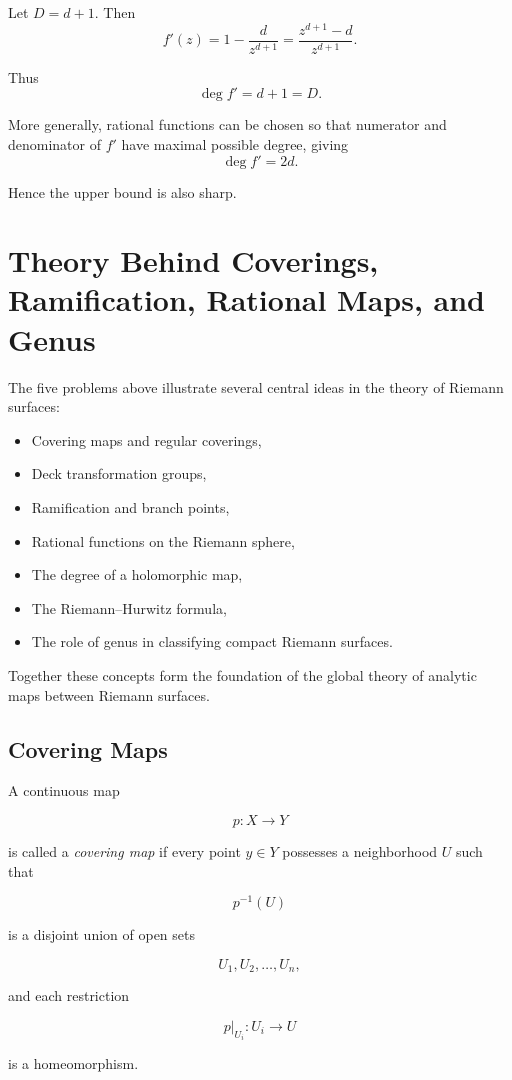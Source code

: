 \documentclass[12pt,a4paper]{article}
\theoremstyle{notespace}
\begin{document}
Let \(D=d+1\). Then
\[
f'(z)=1-\frac{d}{z^{d+1}}
=\frac{z^{d+1}-d}{z^{d+1}}.
\]

Thus
\[
\deg f'=d+1=D.
\]

More generally, rational functions can be chosen so that numerator and denominator of \(f'\) have maximal possible degree, giving
\[
\deg f'=2d.
\]

Hence the upper bound is also sharp.


\section{Theory Behind Coverings, Ramification, Rational Maps, and Genus}

The five problems above illustrate several central ideas in the theory of Riemann surfaces:

\begin{itemize}
	\item Covering maps and regular coverings,
	\item Deck transformation groups,
	\item Ramification and branch points,
	\item Rational functions on the Riemann sphere,
	\item The degree of a holomorphic map,
	\item The Riemann--Hurwitz formula,
	\item The role of genus in classifying compact Riemann surfaces.
\end{itemize}

Together these concepts form the foundation of the global theory of analytic maps between Riemann surfaces.

\subsection{Covering Maps}

A continuous map

\[
p:X\to Y
\]

is called a \emph{covering map} if every point \(y\in Y\) possesses a neighborhood \(U\) such that

\[
p^{-1}(U)
\]

is a disjoint union of open sets

\[
U_1,U_2,\dots,U_n,
\]

and each restriction

\[
p|_{U_i}:U_i\to U
\]

is a homeomorphism.
\end{document}
